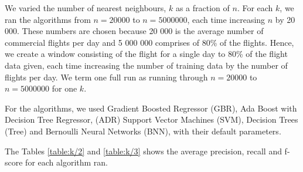 \documentclass[letterpaper,11pt]{article}
\begin{document}
We varied the number of nearest neighbours, $k$ as a fraction of $n$. For each $k$, we ran the algorithms from $n = 20 000$ to $n = 5 000 000$, each time increasing $n$ by 20 000. These numbers are chosen because 20 000 is the average number of commercial flights per day and 5 000 000 comprises of 80\% of the flights. Hence, we create a window consisting of the flight for a single day to 80\% of the flight data given, each time increasing the number of training data by the number of flights per day. We term one full run as running through $n = 20 000$ to $n = 5 000 000$ for one $k$. 

For the algorithms, we used Gradient Boosted Regressor (GBR), Ada Boost with Decision Tree Regressor, (ADR) Support Vector Machines (SVM), Decision Trees (Tree) and Bernoulli Neural Networks (BNN), with their default parameters. 

The Tables \ref{table:k/2} and \ref{table:k/3} shows the average precision, recall and f-score for each algorithm ran. 
\end{document}
